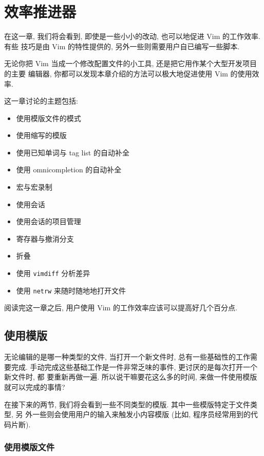 \chapter{效率推进器}
\label{chap:production_boosters}

在这一章, 我们将会看到, 即使是一些小小的改动, 也可以地促进 Vim 的工作效率. 有些
技巧是由 Vim 的特性提供的, 另外一些则需要用户自已编写一些脚本.

无论你把 Vim 当成一个修改配置文件的小工具, 还是把它用作某个大型开发项目的主要
编辑器, 你都可以发现本章介绍的方法可以极大地促进使用 Vim 的使用效率.

这一章讨论的主题包括:
\begin{itemize}
    \item 使用模版文件的模式
    \item 使用缩写的模版
    \item 使用已知单词与 tag list 的自动补全
    \item 使用 omnicompletion 的自动补全
    \item 宏与宏录制
    \item 使用会话
    \item 使用会话的项目管理
    \item 寄存器与撤消分支
    \item 折叠
    \item 使用 \texttt{vimdiff} 分析差异
    \item 使用 \texttt{netrw} 来随时随地地打开文件
\end{itemize}

阅读完这一章之后, 用户使用 Vim 的工作效率应该可以提高好几个百分点.

\section{使用模版}
\label{sec:using_templates}

无论编辑的是哪一种类型的文件, 当打开一个新文件时, 总有一些基础性的工作需要完成.
手动完成这些基础工作是一件非常乏味的事件, 更讨厌的是每次打开一个新文件时, 都
要重新再做一遍. 所以说干嘛要花这么多的时间, 来做一件使用模版就可以完成的事情?

在接下来的两节, 我们将会看到一些不同类型的模版. 其中一些模版特定于文件类型, 另
外一些则会使用用户的输入来触发小内容模版 (比如, 程序员经常用到的代码片断).

\subsection{使用模版文件}
\label{subsec:using_template_files}

